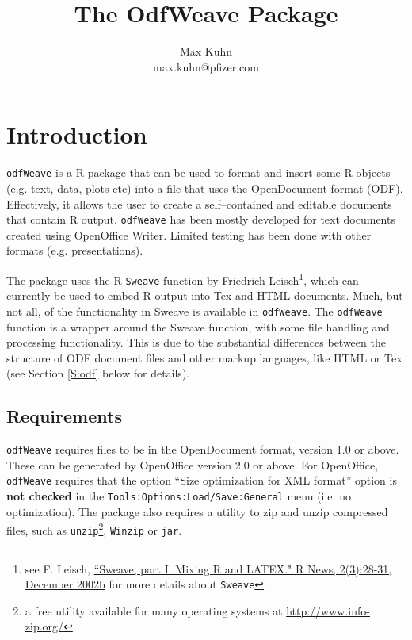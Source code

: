 \documentclass[12pt]{article}
\title{The OdfWeave Package}
\author{Max Kuhn \\ max.kuhn@pfizer.com}
\newcommand{\odfWeave}{{\tt odfWeave}\xspace}
\newcommand{\odfWeaveFunc}{{\tt odfWeave}\xspace}
\begin{document}
\maketitle

\thispagestyle{empty}
	
\section{Introduction}

\odfWeave  is a R package that can be used to format and insert some R objects (e.g. text, data, plots etc) into a file that uses the OpenDocument format (ODF). Effectively, it allows the user to create a self--contained and editable documents that contain R output. \odfWeave  has been mostly developed for text documents created using OpenOffice Writer. Limited testing has been done with other formats (e.g. presentations). 

The package uses the R \texttt{Sweave} function by Friedrich Leisch\footnote{see F. Leisch,  
\href{http://www.ci.tuwien.ac.at/~leisch/Sweave/Sweave-Rnews-2002-3.pdf} {``Sweave, part I: Mixing R and LATEX." R News, 2(3):28-31, December 2002b} for more details about \texttt{Sweave}}, which can currently be used to embed R output into Tex and HTML documents. Much, but not all, of the functionality in Sweave is available in \odfWeave. The \odfWeaveFunc function is a wrapper around the Sweave function, with some file handling and processing functionality. This is due to the substantial differences between the structure of ODF document files and other markup languages, like HTML or Tex (see Section \ref{S:odf} below for details). 

\subsection{Requirements}

\odfWeave  requires files to be in the OpenDocument format, version 1.0 or above. These can be generated by OpenOffice version 2.0 or above. For OpenOffice, \odfWeave  requires that the option ``Size optimization for XML format'' option is {\bf not checked} in the \texttt{Tools:Options:Load/Save:General} menu (i.e. no optimization). The package also requires a utility to zip and unzip compressed files, such as \texttt{unzip}\footnote{a free utility available for many operating systems at  \href{http://www.info-zip.org/} {http://www.info-zip.org/}}, \texttt{Winzip} or \texttt{jar}.
\end{document}
